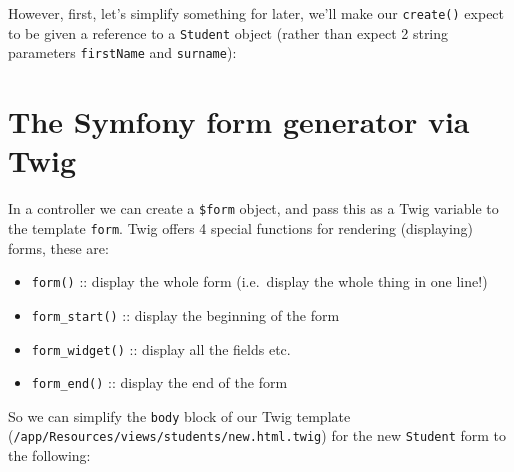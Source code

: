 \documentclass[a4paperpaper,openright]{book}
\newenvironment{Shaded}{}{}
\newcommand{\FunctionTok}[1]{\textcolor[rgb]{0.02,0.16,0.49}{#1}}
\newcommand{\KeywordTok}[1]{\textcolor[rgb]{0.00,0.44,0.13}{\textbf{#1}}}
\newcommand{\NormalTok}[1]{#1}
\newcommand{\OtherTok}[1]{\textcolor[rgb]{0.00,0.44,0.13}{#1}}
\newcommand{\StringTok}[1]{\textcolor[rgb]{0.25,0.44,0.63}{#1}}
\providecommand{\tightlist}{%
  \setlength{\itemsep}{0pt}\setlength{\parskip}{0pt}}
\begin{document}
However, first, let's simplify something for later, we'll make our
\texttt{create()} expect to be given a reference to a \texttt{Student}
object (rather than expect 2 string parameters \texttt{firstName} and
\texttt{surname}):

\begin{Shaded}
\end{Shaded}

\hypertarget{the-symfony-form-generator-via-twig}{%
\section{The Symfony form generator via
Twig}\label{the-symfony-form-generator-via-twig}}

In a controller we can create a \texttt{\$form} object, and pass this as
a Twig variable to the template \texttt{form}. Twig offers 4 special
functions for rendering (displaying) forms, these are:

\begin{itemize}
\tightlist
\item
  \texttt{form()} :: display the whole form (i.e.~display the whole
  thing in one line!)
\item
  \texttt{form\_start()} :: display the beginning of the form
\item
  \texttt{form\_widget()} :: display all the fields etc.
\item
  \texttt{form\_end()} :: display the end of the form
\end{itemize}

So we can simplify the \texttt{body} block of our Twig template
(\texttt{/app/Resources/views/students/new.html.twig}) for the new
\texttt{Student} form to the following:

\begin{Shaded}
\end{Shaded}
\end{document}
